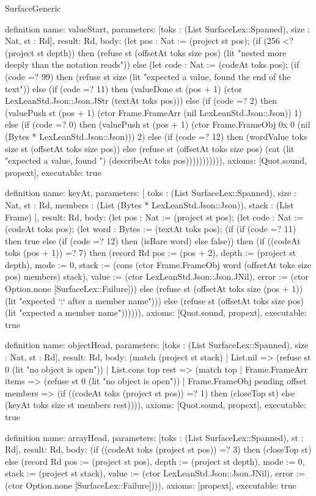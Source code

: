 \begin{lexlean}{SurfaceGeneric}
\begin{semanticmodule}
definition{
  name: valueStart,
  parameters: [toks : (List SurfaceLex::Spanned), size : Nat, st : Rd],
  result: Rd,
  body: (let pos : Nat := (project st pos); (if (256 <? (project st depth)) then (refuse st (offsetAt toks size pos) (lit "nested more deeply than the notation reads")) else (let code : Nat := (codeAt toks pos); (if (code =? 99) then (refuse st size (lit "expected a value, found the end of the text")) else (if (code =? 11) then (valueDone st (pos + 1) (ctor LexLeanStd.Json::Json.JStr (textAt toks pos))) else (if (code =? 2) then (valuePush st (pos + 1) (ctor Frame.FrameArr (nil LexLeanStd.Json::Json)) 1) else (if (code =? 0) then (valuePush st (pos + 1) (ctor Frame.FrameObj 0x 0 (nil (Bytes * LexLeanStd.Json::Json))) 2) else (if (code =? 12) then (wordValue toks size st (offsetAt toks size pos)) else (refuse st (offsetAt toks size pos) (cat (lit "expected a value, found ") (describeAt toks pos))))))))))),
  axioms: [Quot.sound, propext],
  executable: true
}

definition{
  name: keyAt,
  parameters: [
    toks : (List SurfaceLex::Spanned),
    size : Nat,
    st : Rd,
    members : (List (Bytes * LexLeanStd.Json::Json)),
    stack : (List Frame)
  ],
  result: Rd,
  body: (let pos : Nat := (project st pos); (let code : Nat := (codeAt toks pos); (let word : Bytes := (textAt toks pos); (if (if (code =? 11) then true else (if (code =? 12) then (isBare word) else false)) then (if ((codeAt toks (pos + 1)) =? 7) then (record Rd {pos := (pos + 2), depth := (project st depth), mode := 0, stack := (cons (ctor Frame.FrameObj word (offsetAt toks size pos) members) stack), value := (ctor LexLeanStd.Json::Json.JNil), error := (ctor Option.none [SurfaceLex::Failure])}) else (refuse st (offsetAt toks size (pos + 1)) (lit "expected `:` after a member name"))) else (refuse st (offsetAt toks size pos) (lit "expected a member name")))))),
  axioms: [Quot.sound, propext],
  executable: true
}

definition{
  name: objectHead,
  parameters: [toks : (List SurfaceLex::Spanned), size : Nat, st : Rd],
  result: Rd,
  body: (match (project st stack)
    | List.nil => (refuse st 0 (lit "no object is open"))
    | List.cons top rest => (match top
      | Frame.FrameArr items => (refuse st 0 (lit "no object is open"))
      | Frame.FrameObj pending offset members => (if ((codeAt toks (project st pos)) =? 1) then (closeTop st) else (keyAt toks size st members rest)))),
  axioms: [Quot.sound, propext],
  executable: true
}

definition{
  name: arrayHead,
  parameters: [toks : (List SurfaceLex::Spanned), st : Rd],
  result: Rd,
  body: (if ((codeAt toks (project st pos)) =? 3) then (closeTop st) else (record Rd {pos := (project st pos), depth := (project st depth), mode := 0, stack := (project st stack), value := (ctor LexLeanStd.Json::Json.JNil), error := (ctor Option.none [SurfaceLex::Failure])})),
  axioms: [propext],
  executable: true
}


\end{semanticmodule}
\end{lexlean}

